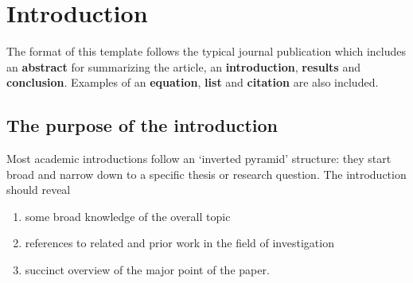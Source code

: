 \section{Introduction}

The format of this template follows the typical journal publication which includes an \textbf{abstract} for summarizing the article, an \textbf{introduction}, \textbf{results} and \textbf{conclusion}. Examples of an \textbf{equation}, \textbf{list} and \textbf{citation} are also included.

\subsection{The purpose of the introduction}

Most academic introductions follow an ‘inverted pyramid’ structure: they start broad and narrow down to a specific thesis or research question.
The introduction should reveal

\begin{enumerate}
\item some broad knowledge of the overall topic
\item references to related and prior work in the field of investigation
\item succinct overview of the major point of the paper.
\end{enumerate}